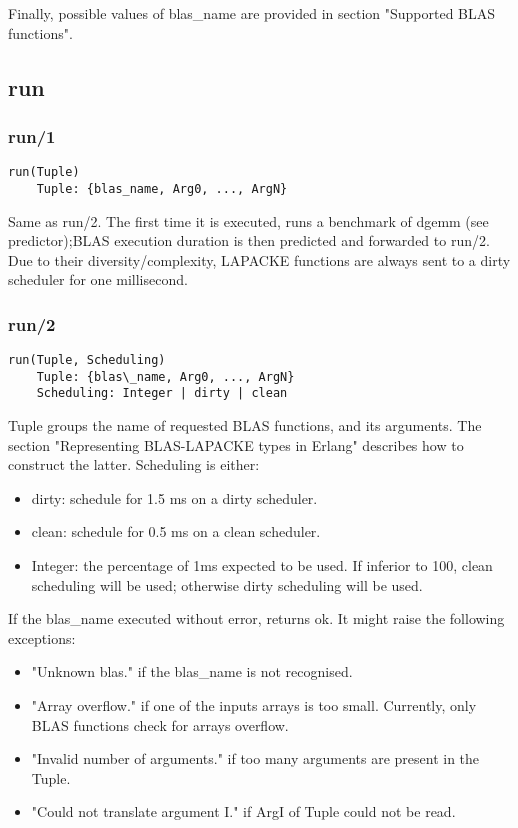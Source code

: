 \documentclass{article}
\begin{document}
Finally, possible values of blas\_name are provided in section "Supported BLAS functions".
    
    \subsection{run}
        \subsubsection{run/1}
        \begin{verbatim}
run(Tuple)
    Tuple: {blas_name, Arg0, ..., ArgN}
        \end{verbatim}
        Same as run/2. The first time it is executed, runs a benchmark of dgemm (see predictor);BLAS  execution duration is then predicted and forwarded to run/2.
        Due to their diversity/complexity, LAPACKE functions are always sent to a dirty scheduler for one millisecond.

        \subsubsection{run/2}
        \begin{verbatim}
run(Tuple, Scheduling)
    Tuple: {blas\_name, Arg0, ..., ArgN}
    Scheduling: Integer | dirty | clean
        \end{verbatim}
        Tuple groups the name of requested BLAS functions, and its arguments. The section "Representing BLAS-LAPACKE types in Erlang" describes how to construct the latter.
        Scheduling is either:
        \begin{itemize}
            \item dirty: schedule for 1.5 ms on a dirty scheduler.
            \item clean: schedule for 0.5 ms on a clean scheduler.
            \item Integer: the percentage of 1ms expected to be used. If inferior to 100, clean scheduling will be used; otherwise dirty scheduling will be used.
        \end{itemize}

        If the blas\_name executed without error, returns ok. It might raise the following exceptions:
        \begin{itemize}
            \item "Unknown blas." if the blas\_name is not recognised.
            \item "Array overflow." if one of the inputs arrays is too small. Currently, only BLAS functions check for arrays overflow.
            \item "Invalid number of arguments." if too many arguments are present in the Tuple.
            \item "Could not translate argument I." if ArgI of Tuple could not be read.
        \end{itemize}
    
\end{document}
